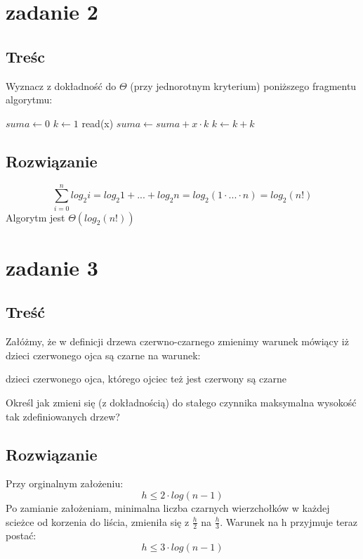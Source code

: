 \documentclass[svgnames]{report}
\begin{document}

\section{zadanie 2}
\subsection{Treśc}
Wyznacz z dokładność do $\Theta$ (przy jednorotnym kryterium) poniższego fragmentu algorytmu:
\begin{algorithmic}
\STATE $suma \leftarrow 0$
	\STATE $k \leftarrow 1$
		\STATE read(x)
		\STATE $suma \leftarrow suma + x \cdot k$
		\STATE $k \leftarrow k + k$
	\ENDWHILE
\ENDFOR
\end{algorithmic}
\subsection{Rozwiązanie}

\begin{equation*}
	\sum\limits_{i=0}^{n} log_2 i = log_2 1 + ... + log_2 n = log_2(1 \cdot ... \cdot n) = log_2(n!)
\end{equation*}
Algorytm jest $\Theta(log_2(n!))$


\section{zadanie 3}
\subsection{Treść}
Załóżmy, że w definicji drzewa czerwno-czarnego zmienimy warunek mówiący iż dzieci czerwonego ojca są czarne na warunek:

dzieci czerwonego ojca, którego ojciec też jest czerwony są czarne

Określ jak zmieni się (z dokładnością) do stałego czynnika maksymalna wysokość tak zdefiniowanych drzew?

\subsection{Rozwiązanie}

Przy orginalnym założeniu:
\begin{equation*}
h \leqslant 2 \cdot log(n-1)
\end{equation*}
Po zamianie założeniam, minimalna liczba czarnych wierzchołków w każdej scieżce od korzenia do liścia, zmieniła się z $\frac{h}{2}$ na $\frac{h}{3}$. Warunek na h przyjmuje teraz postać:
\begin{equation*}
h \leqslant 3 \cdot log(n-1)
\end{equation*}
\end{document}
